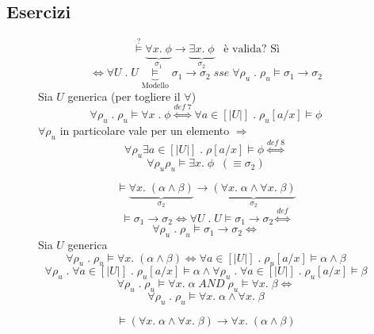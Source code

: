 \documentclass{article}
\theoremstyle{break}
\theoremstyle{break}
\theoremstyle{break}
\theoremstyle{break}
\begin{document}
\subsection{Esercizi}
\begin{figure}[H]
  \begin{exercise}
    \[
      \stackrel{?}{\models} \underbrace{\forall x.\; \phi}_{\sigma_1} \to \underbrace{\exists x.\; \phi}_{\sigma_2} \;\;\; \text{è valida? Sì}
    \] 
    \[
      \Leftrightarrow \forall U\;.\; U \underbrace{\models}_{\text{Modello}} \sigma_1 \to \sigma_2 \;sse\; \forall \rho_u \;.\; \rho_u \models \sigma_1 \to \sigma_2
    \] 
    Sia \( U \) generica (per togliere il \( \forall  \))
    \[
      \forall \rho_u\;.\; \rho_u \models \forall x\;.\;\phi \stackrel{def\;7}{\Leftrightarrow} \forall a \in [|U|] \;.\; \rho_u[a/x] \models \phi
    \] 
    \( \forall \rho_u \) in particolare vale per un elemento \( \Rightarrow \) \[\forall \rho_u \exists a \in [|U|]\;.\;\rho[a/x] \models \phi \stackrel{def\;8}{\Leftrightarrow}\] 
    \[
    \forall \rho_u \rho_u \models \exists x.\; \phi\;\;(\equiv \sigma_2)
    \] 
  \end{exercise}
\end{figure}
\begin{figure}[H]
  \begin{exercise}
    \[
      \models \underbrace{\forall x. \; (\alpha \wedge \beta)}_{\sigma_2} \to \underbrace{(\forall x.\;\alpha \wedge \forall x.\; \beta)}_{\sigma_2}
    \] 
    \[
      \models \sigma_1 \to \sigma_2 \Leftrightarrow \forall U \;.\; U \models \sigma_1 \to \sigma_2 \stackrel{def}{\Leftrightarrow}
    \] 
    \[
    \forall \rho_u \;.\; \rho_u \models \sigma_1 \to \sigma_2 \Leftrightarrow
    \] 
    Sia \( U \) generica
    \[
      \forall \rho_u\;.\; \rho_u \models \forall x.\; (\alpha \wedge \beta) \Leftrightarrow \forall a \in [|U|]\;.\; \rho_u[a/x] \models \alpha \wedge \beta
    \] 
    \[
      \forall \rho_u \;.\; \forall a \in [|U|]\;.\; \rho_u[a/x] \models \alpha \wedge \forall \rho_u \;.\; \forall a \in [|U|]\;.\; \rho_u[a/x] \models \beta
    \] 
    \[
    \forall \rho_u\;.\; \rho_u \models \forall x.\;\alpha \;AND\;\rho_u \models \forall x.\; \beta \Leftrightarrow
    \] 
    \[
    \forall \rho_u\;.\; \rho_u \models \forall x.\;\alpha \wedge \forall x.\; \beta
    \] 
  \end{exercise}
\end{figure}
\begin{figure}[H]
  \begin{exercise}[a casa]
    \[
    \models (\forall x.\;\alpha \wedge \forall x.\; \beta) \to \forall x. \; (\alpha \wedge \beta)
  \] 
  \end{exercise}
\end{figure}
\end{document}
